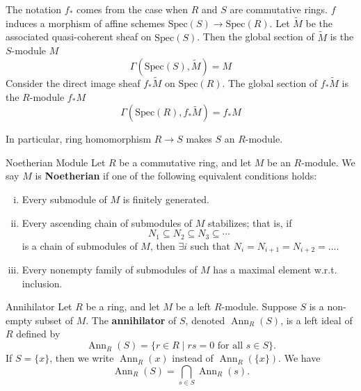 \begin{remark}
   The notation $f_*$ comes from the case when $R$ and $S$ are commutative rings. $f$ induces a morphism of affine schemes $\mathrm{Spec}(S)\to \mathrm{Spec}(R)$. Let $\widetilde{M}$ be the associated quasi-coherent sheaf on $\mathrm{Spec}(S)$. Then the global section of $\widetilde{M}$ is the $S$-module $M$
    \[
        \Gamma\left(\mathrm{Spec}(S), \widetilde{M}\right)=M
    \]
    Consider the direct image sheaf $f_*\widetilde{M}$ on $\mathrm{Spec}(R)$. The global section of $f_*\widetilde{M}$ is the $R$-module $f_*M$
    \[
        \Gamma\left(\mathrm{Spec}(R), f_*\widetilde{M}\right)=f_*M
    \]
\end{remark}

In particular, ring homomorphism $R\to S$ makes $S$ an $R$-module.

\begin{definition}{Noetherian Module}{}
Let $R$ be a commutative ring, and let $M$ be an $R$-module. We say $M$ is \textbf{Noetherian} if one of the following equivalent conditions holds:
\begin{enumerate}[(i)]
    \item Every submodule of $M$ is finitely generated.
    \item Every ascending chain of submodules of $M$ stabilizes; that is, if
    $$
    N_1 \subseteq N_2 \subseteq N_3 \subseteq \cdots
    $$
    is a chain of submodules of $M$, then $\exists i$ such that $N_i=N_{i+1}=N_{i+2}=\ldots$.
    \item Every nonempty family of submodules of $M$ has a maximal element w.r.t. inclusion.
\end{enumerate}
\end{definition}


\begin{definition}{Annihilator}{}
    Let $R$ be a ring, and let $M$ be a left $R$-module. Suppose $S$ is a non-empty subset of $M$. The \textbf{annihilator} of $S$, denoted $\operatorname{Ann}_R(S)$, is a left ideal of $R$ defined by 
    $$
    \operatorname{Ann}_R(S)=\{r \in R \mid r s=0 \text { for all } s \in S\}.
    $$
    If $S=\{ x \}$, then we write $\operatorname{Ann}_R(x)$ instead of $\operatorname{Ann}_R(\{ x \})$. We have
    $$
    \operatorname{Ann}_R(S)=\bigcap_{s \in S} \operatorname{Ann}_R(s).
    $$
\end{definition}

